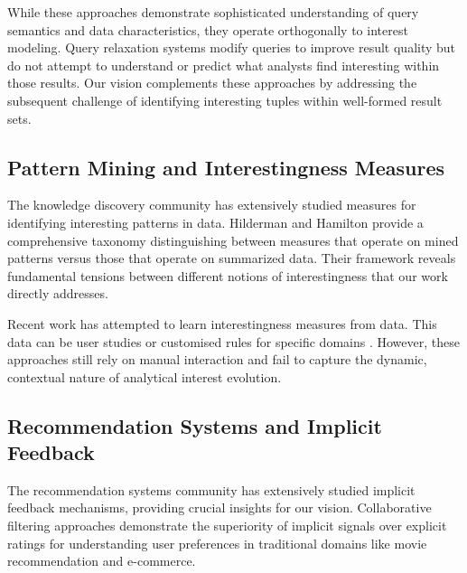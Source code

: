 \documentclass[sigconf, nonacm]{acmart}
\begin{document}
While these approaches demonstrate sophisticated understanding of query semantics and data characteristics, they operate orthogonally to interest modeling. Query relaxation systems modify queries to improve result quality but do not attempt to understand or predict what analysts find interesting within those results. Our vision complements these approaches by addressing the subsequent challenge of identifying interesting tuples within well-formed result sets.

\subsection{Pattern Mining and Interestingness Measures}

The knowledge discovery community has extensively studied measures for identifying interesting patterns in data. Hilderman and Hamilton \cite{robertj.hildermanKnowledgeDiscoveryMeasures2001} provide a comprehensive taxonomy distinguishing between measures that operate on mined patterns versus those that operate on summarized data. Their framework reveals fundamental tensions between different notions of interestingness that our work directly addresses.


Recent work has attempted to learn interestingness measures from data. This data can be user studies \cite{das2018learning} or customised rules for specific domains \cite{ruiz2014learning}. However, these approaches still rely on manual interaction and fail to capture the dynamic, contextual nature of analytical interest evolution.

\subsection{Recommendation Systems and Implicit Feedback}

The recommendation systems community has extensively studied implicit feedback mechanisms, providing crucial insights for our vision. Collaborative filtering approaches \cite{hu2008collaborative, koren2009matrix} demonstrate the superiority of implicit signals over explicit ratings for understanding user preferences in traditional domains like movie recommendation and e-commerce.
\end{document}
